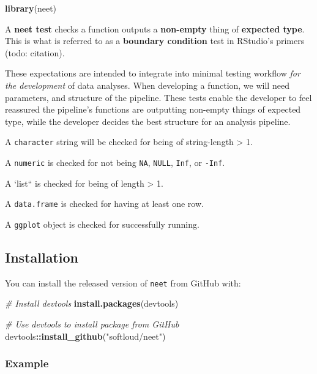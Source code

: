 \documentclass[
]{article}
\newenvironment{Shaded}{\begin{snugshade}}{\end{snugshade}}
\newcommand{\CommentTok}[1]{\textcolor[rgb]{0.56,0.35,0.01}{\textit{#1}}}
\newcommand{\KeywordTok}[1]{\textcolor[rgb]{0.13,0.29,0.53}{\textbf{#1}}}
\newcommand{\NormalTok}[1]{#1}
\newcommand{\OperatorTok}[1]{\textcolor[rgb]{0.81,0.36,0.00}{\textbf{#1}}}
\newcommand{\StringTok}[1]{\textcolor[rgb]{0.31,0.60,0.02}{#1}}
\begin{document}
\begin{Shaded}
\begin{Highlighting}[]
\KeywordTok{library}\NormalTok{(neet)}
\end{Highlighting}
\end{Shaded}

A \textbf{neet test} checks a function outputs a \textbf{non-empty} thing of \textbf{expected type}. This is what is referred to as a \textbf{boundary condition} test in RStudio's primers (todo: citation).

These expectations are intended to integrate into minimal testing workflow
\emph{for the development} of data analyses. When developing a function, we will need parameters, and structure of the pipeline. These tests
enable the developer to feel reassured the pipeline's functions are
outputting non-empty things of expected type, while the developer decides the best structure for an analysis pipeline.

A \texttt{character} string will be checked for being of string-length \textgreater{} 1.

A \texttt{numeric} is checked for not being \texttt{NA}, \texttt{NULL}, \texttt{Inf}, or \texttt{-Inf}.

A `list`` is checked for being of length \textgreater{} 1.

A \texttt{data.frame} is checked for having at least one row.

A \texttt{ggplot} object is checked for successfully running.

\hypertarget{installation}{%
\subsection{Installation}\label{installation}}

You can install the released version of \texttt{neet} from GitHub with:

\begin{Shaded}
\begin{Highlighting}[]
\CommentTok{\# Install devtools}
\KeywordTok{install.packages}\NormalTok{(devtools) }

\CommentTok{\# Use devtools to install package from GitHub}
\NormalTok{devtools}\OperatorTok{::}\KeywordTok{install\_github}\NormalTok{(}\StringTok{"softloud/neet"}\NormalTok{)}
\end{Highlighting}
\end{Shaded}

\hypertarget{example}{%
\subsubsection{Example}\label{example}}
\end{document}
